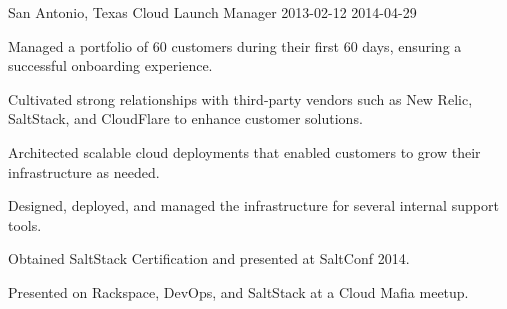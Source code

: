 \begin{role}
{\companyrackspace}
{San Antonio, Texas}
{Cloud Launch Manager }
{2013-02-12}
{2014-04-29}
    \item Managed a portfolio of 60 customers during their first 60 days, ensuring a successful onboarding experience.
    \item Cultivated strong relationships with third-party vendors such as New Relic, SaltStack, and CloudFlare to enhance customer solutions.
    \item Architected scalable cloud deployments that enabled customers to grow their infrastructure as needed.
    \item Designed, deployed, and managed the infrastructure for several internal support tools.
    \item Obtained SaltStack Certification and presented at SaltConf 2014.
    \item Presented on Rackspace, DevOps, and SaltStack at a Cloud Mafia meetup.
\end{role}
